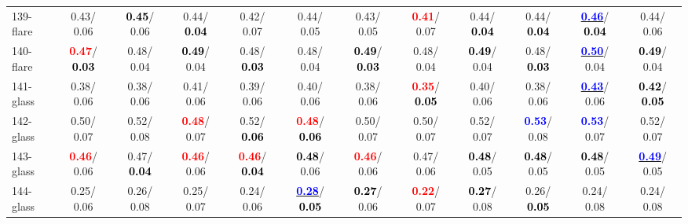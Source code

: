 \begin{table}[h]
\begin{center}
{\begin{tabular}{lc|c|c|c|c|c|c|c|c|c|c}
139-flare &   0.43/  0.06 & \textcolor{black}{\textbf{  0.45}}/  0.06 &   0.44/\textcolor{black}{\textbf{  0.04}} &   0.42/  0.07 &   0.44/  0.05 &   0.43/  0.05 & \textcolor{red}{\textbf{  0.41}}/  0.07 &   0.44/\textcolor{black}{\textbf{  0.04}} &   0.44/\textcolor{black}{\textbf{  0.04}} & \underline{\textcolor{blue}{\textbf{  0.46}}}/\textcolor{black}{\textbf{  0.04}} &   0.44/  0.06 \\
140-flare & \textcolor{red}{\textbf{  0.47}}/\textcolor{black}{\textbf{  0.03}} &   0.48/  0.04 & \textcolor{black}{\textbf{  0.49}}/  0.04 &   0.48/\textcolor{black}{\textbf{  0.03}} &   0.48/  0.04 & \textcolor{black}{\textbf{  0.49}}/\textcolor{black}{\textbf{  0.03}} &   0.48/  0.04 & \textcolor{black}{\textbf{  0.49}}/  0.04 &   0.48/\textcolor{black}{\textbf{  0.03}} & \underline{\textcolor{blue}{\textbf{  0.50}}}/  0.04 & \textcolor{black}{\textbf{  0.49}}/  0.04 \\
141-glass &   0.38/  0.06 &   0.38/  0.06 &   0.41/  0.06 &   0.39/  0.06 &   0.40/  0.06 &   0.38/  0.06 & \textcolor{red}{\textbf{  0.35}}/\textcolor{black}{\textbf{  0.05}} &   0.40/  0.06 &   0.38/  0.06 & \underline{\textcolor{blue}{\textbf{  0.43}}}/  0.06 & \textcolor{black}{\textbf{  0.42}}/\textcolor{black}{\textbf{  0.05}} \\
142-glass &   0.50/  0.07 &   0.52/  0.08 & \textcolor{red}{\textbf{  0.48}}/  0.07 &   0.52/\textcolor{black}{\textbf{  0.06}} & \textcolor{red}{\textbf{  0.48}}/\textcolor{black}{\textbf{  0.06}} &   0.50/  0.07 &   0.50/  0.07 &   0.52/  0.07 & \textcolor{blue}{\textbf{  0.53}}/  0.08 & \textcolor{blue}{\textbf{  0.53}}/  0.07 &   0.52/  0.07 \\ \hline
143-glass & \textcolor{red}{\textbf{  0.46}}/  0.06 &   0.47/\textcolor{black}{\textbf{  0.04}} & \textcolor{red}{\textbf{  0.46}}/  0.06 & \textcolor{red}{\textbf{  0.46}}/\textcolor{black}{\textbf{  0.04}} & \textcolor{black}{\textbf{  0.48}}/  0.06 & \textcolor{red}{\textbf{  0.46}}/  0.06 &   0.47/  0.06 & \textcolor{black}{\textbf{  0.48}}/  0.05 & \textcolor{black}{\textbf{  0.48}}/  0.05 & \textcolor{black}{\textbf{  0.48}}/  0.05 & \underline{\textcolor{blue}{\textbf{  0.49}}}/  0.05 \\
144-glass &   0.25/  0.06 &   0.26/  0.08 &   0.25/  0.07 &   0.24/  0.06 & \underline{\textcolor{blue}{\textbf{  0.28}}}/\textcolor{black}{\textbf{  0.05}} & \textcolor{black}{\textbf{  0.27}}/  0.06 & \textcolor{red}{\textbf{  0.22}}/  0.07 & \textcolor{black}{\textbf{  0.27}}/  0.08 &   0.26/\textcolor{black}{\textbf{  0.05}} &   0.24/  0.08 &   0.24/  0.08 \\

\end{tabular}}
\end{center}
\end{table}
